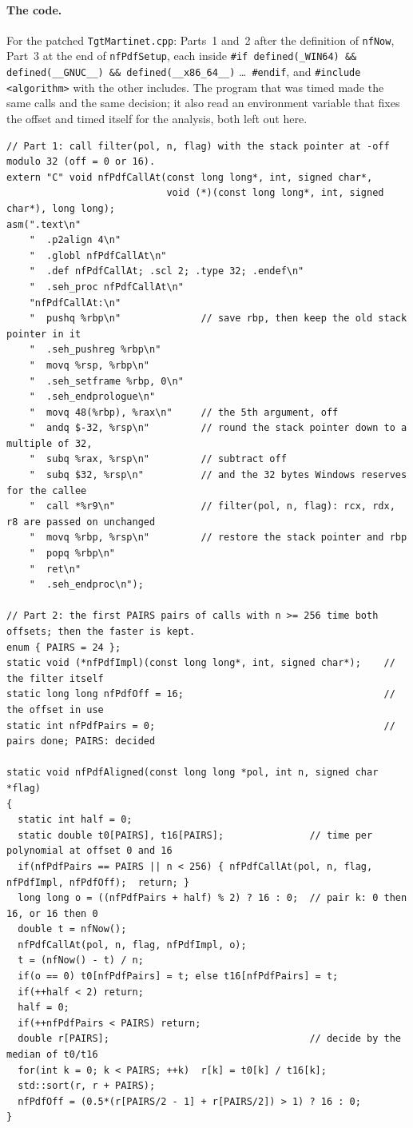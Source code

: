 \documentclass[10pt,a4paper]{article}
\newcommand{\code}[1]{\texttt{#1}}
\theoremstyle{plain}
\theoremstyle{definition}
\begin{document}
\paragraph{The code.}  For the patched \code{TgtMartinet.cpp}: Parts~1 and~2 after the definition of \code{nfNow}, Part~3 at the end of \code{nfPdfSetup},
each inside \code{\#if defined(\_WIN64) \&\& defined(\_\_GNUC\_\_) \&\& defined(\_\_x86\_64\_\_)} \dots\ \code{\#endif}, and \code{\#include <algorithm>} with the other
includes.  The program that was timed made the same calls and the same decision; it also read an environment variable that fixes the offset and timed
itself for the analysis, both left out here.

{\footnotesize
\begin{verbatim}
// Part 1: call filter(pol, n, flag) with the stack pointer at -off modulo 32 (off = 0 or 16).
extern "C" void nfPdfCallAt(const long long*, int, signed char*,
                            void (*)(const long long*, int, signed char*), long long);
asm(".text\n"
    "  .p2align 4\n"
    "  .globl nfPdfCallAt\n"
    "  .def nfPdfCallAt; .scl 2; .type 32; .endef\n"
    "  .seh_proc nfPdfCallAt\n"
    "nfPdfCallAt:\n"
    "  pushq %rbp\n"              // save rbp, then keep the old stack pointer in it
    "  .seh_pushreg %rbp\n"
    "  movq %rsp, %rbp\n"
    "  .seh_setframe %rbp, 0\n"
    "  .seh_endprologue\n"
    "  movq 48(%rbp), %rax\n"     // the 5th argument, off
    "  andq $-32, %rsp\n"         // round the stack pointer down to a multiple of 32,
    "  subq %rax, %rsp\n"         // subtract off
    "  subq $32, %rsp\n"          // and the 32 bytes Windows reserves for the callee
    "  call *%r9\n"               // filter(pol, n, flag): rcx, rdx, r8 are passed on unchanged
    "  movq %rbp, %rsp\n"         // restore the stack pointer and rbp
    "  popq %rbp\n"
    "  ret\n"
    "  .seh_endproc\n");

// Part 2: the first PAIRS pairs of calls with n >= 256 time both offsets; then the faster is kept.
enum { PAIRS = 24 };
static void (*nfPdfImpl)(const long long*, int, signed char*);    // the filter itself
static long long nfPdfOff = 16;                                   // the offset in use
static int nfPdfPairs = 0;                                        // pairs done; PAIRS: decided

static void nfPdfAligned(const long long *pol, int n, signed char *flag)
{
  static int half = 0;
  static double t0[PAIRS], t16[PAIRS];               // time per polynomial at offset 0 and 16
  if(nfPdfPairs == PAIRS || n < 256) { nfPdfCallAt(pol, n, flag, nfPdfImpl, nfPdfOff);  return; }
  long long o = ((nfPdfPairs + half) % 2) ? 16 : 0;  // pair k: 0 then 16, or 16 then 0
  double t = nfNow();
  nfPdfCallAt(pol, n, flag, nfPdfImpl, o);
  t = (nfNow() - t) / n;
  if(o == 0) t0[nfPdfPairs] = t; else t16[nfPdfPairs] = t;
  if(++half < 2) return;
  half = 0;
  if(++nfPdfPairs < PAIRS) return;
  double r[PAIRS];                                   // decide by the median of t0/t16
  for(int k = 0; k < PAIRS; ++k)  r[k] = t0[k] / t16[k];
  std::sort(r, r + PAIRS);
  nfPdfOff = (0.5*(r[PAIRS/2 - 1] + r[PAIRS/2]) > 1) ? 16 : 0;
}


\end{verbatim}}
\end{document}
